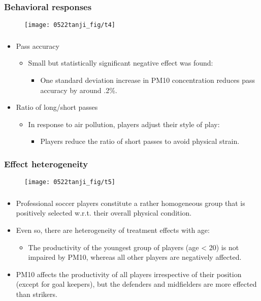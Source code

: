 \documentclass[dvipdfmx,11pt]{beamer}
\begin{document}
\begin{frame}\frametitle{Behavioral responses}
  \begin{figure}
    \centering
    \texttt{[image: 0522tanji\_fig/t4]}
    \label{t4}
  \end{figure}
\end{frame}

\begin{frame}\frametitle{}
  \begin{itemize}
    \item Pass accuracy
    \begin{itemize}
      \item Small but statistically significant negative effect was found:
      \begin{itemize}
        \item One standard deviation increase in PM10 concentration reduces pass accuracy by around .2\%.
      \end{itemize}
    \end{itemize}
    \item Ratio of long/short passes
    \begin{itemize}
      \item In response to air pollution, players adjust their style of play:
      \begin{itemize}
        \item Players reduce the ratio of short passes to avoid physical strain.
      \end{itemize}
    \end{itemize}
  \end{itemize}
\end{frame}

\begin{frame}\frametitle{Effect heterogeneity}
  \begin{figure}
    \centering
    \texttt{[image: 0522tanji\_fig/t5]}
    \label{t5}
  \end{figure}
\end{frame}

\begin{frame}\frametitle{}
  \begin{itemize}
    \item Professional soccer players constitute a rather homogeneous group that is positively selected w.r.t. their overall physical condition.
    \item Even so, there are heterogeneity of treatment effects with age:
    \begin{itemize}
      \item The productivity of the youngest group of players (age < 20) is not impaired by PM10, whereas all other players are negatively affected.
    \end{itemize}
    \item PM10 affects the productivity of all players irrespective of their position (except for goal keepers), but the defenders and midfielders are more effected than strikers.
  \end{itemize}
\end{frame}
\end{document}
